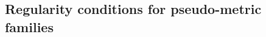 \documentclass [11pt,reqno]{amsart}
\newcommand{\1}{\mathmybb{1}}
\def\cO{{\mathcal{O}}}
\begin{document}

\subsection{Regularity conditions for pseudo-metric families}
\label{sub:regularity_pseudo-metric_families}
\end{document}
